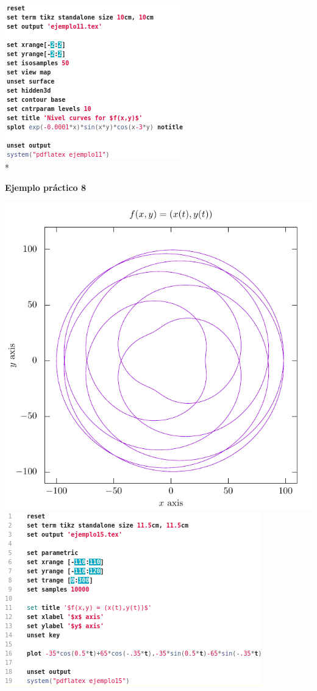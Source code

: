 \documentclass[11.5pt,a4paper]{article}
\begin{document}
\includegraphics[scale=0.6]{screen12.png}\\*

\textbf{Ejemplo práctico 8}

\includegraphics[scale=0.50]{ejemplo15.pdf}
\includegraphics[scale=0.6]{screen19.png}
\end{document}

